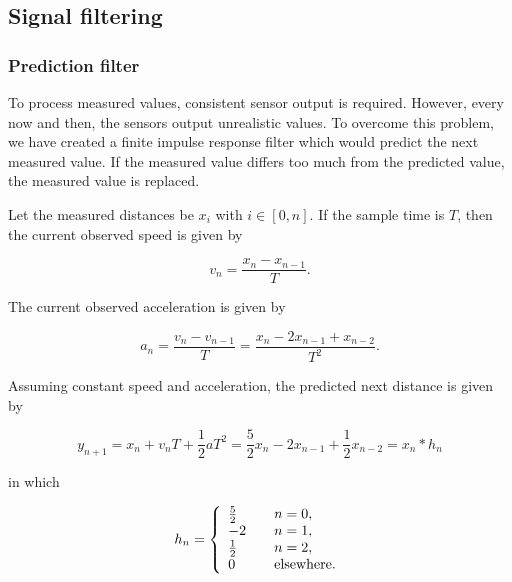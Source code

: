 \documentclass[11pt,titlepage]{report}
\begin{document}
\begin{appendices}
\renewcommand{\chapternumber}{\appendixname\space\thechapter}


\chapter{Signal filtering}
\label{app:signal-filtering}
\subsection{Prediction filter}
To process measured values, consistent sensor output is required. However, every now and then, the sensors output unrealistic values. To overcome this problem, we have created a finite impulse response filter which would predict the next measured value. If the measured value differs too much from the predicted value, the measured value is replaced.

Let the measured distances be $x_i$ with $i \in [0,n]$. If the sample time is $T$, then the current observed speed is given by

\begin{equation}
	v_n = \frac{x_{n} - x_{n-1}}{T}.
\end{equation}

The current observed acceleration is given by

\begin{equation}
	a_n = \frac{v_n - v_{n-1}}{T} = \frac{x_{n} - 2 x_{n-1} + x_{n-2}}{T^2}.
\end{equation}

Assuming constant speed and acceleration, the predicted next distance is given by

\begin{equation}
	y_{n+1} = x_{n} + v_n T + \frac{1}{2} a T^2 = \frac{5}{2} x_n - 2 x_{n-1} + \frac{1}{2} x_{n-2}= x_n \ast h_n
\end{equation}

in which

\begin{equation}
	h_n = \left\{
	\begin{array}{l l}
		\frac{5}{2} & \quad n = 0, \\
		-2 & \quad n = 1, \\
		\frac{1}{2} & \quad n = 2, \\
		0 & \quad \text{elsewhere}.
	\end{array}
	\right.
\end{equation}


\end{appendices}
\end{document}

